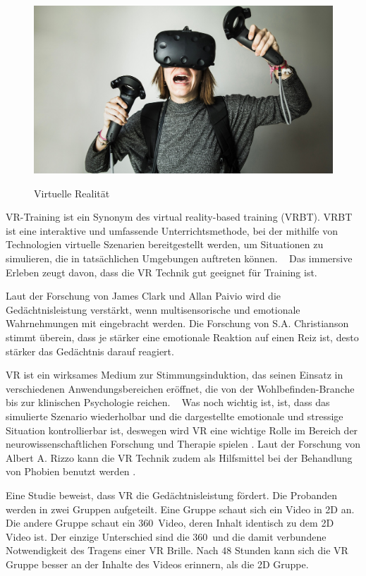\begin{figure}[ht]
\vspace*{1em}
\centering
\caption{Virtuelle Realität}
\includegraphics[width=\textwidth]{images/vrhtcvive.jpg}
\label{fig:vrhtcvive} 
\end{figure}

VR-Training ist ein Synonym des virtual reality-based training (VRBT). \glqq VRBT ist eine interaktive und umfassende Unterrichtsmethode, bei der mithilfe von Technologien virtuelle Szenarien bereitgestellt werden, um Situationen zu simulieren, die in tatsächlichen Umgebungen auftreten können. \grqq\ \citep{14} 
Das immersive Erleben zeugt davon, dass die VR Technik gut geeignet für Training ist.

Laut der Forschung von James Clark und Allan Paivio \citep{10} wird die Gedächtnisleistung verstärkt, wenn multisensorische und emotionale Wahrnehmungen mit eingebracht werden. Die Forschung von S.A. Christianson \citep{11} stimmt überein, dass je stärker eine emotionale Reaktion auf einen Reiz ist, desto stärker das Gedächtnis darauf reagiert. 

\glqq VR ist ein wirksames Medium zur Stimmungsinduktion, das seinen Einsatz in verschiedenen Anwendungsbereichen eröffnet, die von der Wohlbefinden-Branche bis zur klinischen Psychologie reichen. \grqq\ \citep{29} Was noch wichtig ist, ist, dass das simulierte Szenario wiederholbar und die dargestellte emotionale und stressige Situation kontrollierbar ist, deswegen wird VR eine wichtige Rolle im Bereich der neurowissenschaftlichen Forschung und Therapie spielen \citep{13}. Laut der Forschung von Albert A. Rizzo kann die VR Technik zudem als Hilfsmittel bei der Behandlung von Phobien benutzt werden \citep{12}. 

Eine Studie \citep{30} beweist, dass VR die Gedächtnisleistung fördert. Die Probanden werden in zwei Gruppen aufgeteilt. Eine Gruppe schaut sich ein Video in 2D an. Die andere Gruppe schaut ein 360\degree\ Video, deren Inhalt identisch zu dem 2D Video ist. Der einzige Unterschied sind die 360\degree\ und die damit verbundene Notwendigkeit des Tragens einer VR Brille. Nach 48 Stunden kann sich die VR Gruppe besser an der Inhalte des Videos erinnern, als die 2D Gruppe.

